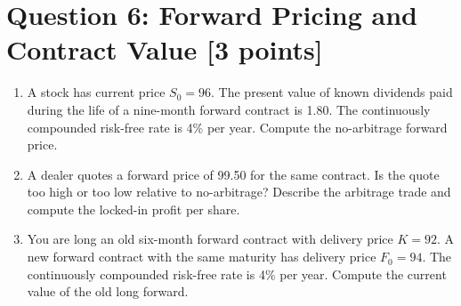 \documentclass[11pt]{article}
\newcommand{\pts}[1]{\hspace{0.35em}\textnormal{\textbf{[#1 points]}}}
\newcommand{\Fzero}{F_0}
\newcommand{\K}{K}
\begin{document}
\section*{Question 6: Forward Pricing and Contract Value \pts{3}}

\begin{enumerate}
    \item A stock has current price $S_0=96$. The present value of known
    dividends paid during the life of a nine-month forward contract is 1.80. The
    continuously compounded risk-free rate is 4\% per year. Compute the
    no-arbitrage forward price.
    \item A dealer quotes a forward price of 99.50 for the same contract. Is the
    quote too high or too low relative to no-arbitrage? Describe the arbitrage
    trade and compute the locked-in profit per share.
    \item You are long an old six-month forward contract with delivery price
    $\K=92$. A new forward contract with the same maturity has delivery price
    $\Fzero=94$. The continuously compounded risk-free rate is 4\% per year.
    Compute the current value of the old long forward.
\end{enumerate}
\end{document}
